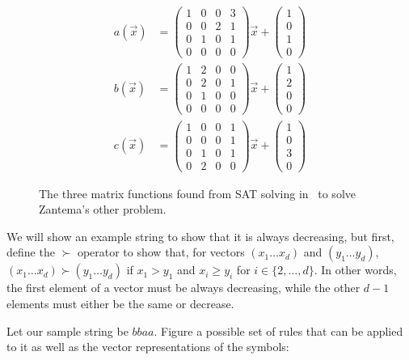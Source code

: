 \begin{figure}
\label{fig:zantmats}
\begin{align*}
a(\Vec{x}) &= \begin{pmatrix}
1&0&0&3\\
0&0&2&1\\
0&1&0&1\\
0&0&0&0
\end{pmatrix} \Vec{x} + \begin{pmatrix}
1\\
0\\
1\\
0
\end{pmatrix}\\
b(\Vec{x}) &= \begin{pmatrix}
1&2&0&0\\
0&2&0&1\\
0&1&0&0\\
0&0&0&0
\end{pmatrix} \Vec{x} + \begin{pmatrix}
1\\
2\\
0\\
0
\end{pmatrix}\\
c(\Vec{x}) &= \begin{pmatrix}
1&0&0&1\\
0&0&0&1\\
0&1&0&1\\
0&2&0&0
\end{pmatrix} \Vec{x} + \begin{pmatrix}
1\\
0\\
3\\
0
\end{pmatrix}
\end{align*}
\caption{The three matrix functions found from SAT solving in~\cite{Hofbauer:2006:TA:1142725.1711178} to solve Zantema's other problem.}
\end{figure}
We will show an example string to show that it is always decreasing, but first, define the $\succ$ operator to show that, for vectors $(x_1 \ldots x_d)$ and $(y_1 \ldots y_d)$, $(x_1 \ldots x_d) \succ (y_1 \ldots y_d)$ if $x_1 > y_1$ and $x_i \geq y_i$ for $i \in \{2, \ldots, d\}$. In other words, the first element of a vector must be always decreasing, while the other $d-1$ elements must either be the same or decrease. \par
Let our sample string be $bbaa$. Figure a possible set of rules that can be applied to it as well as the vector representations of the symbols:
